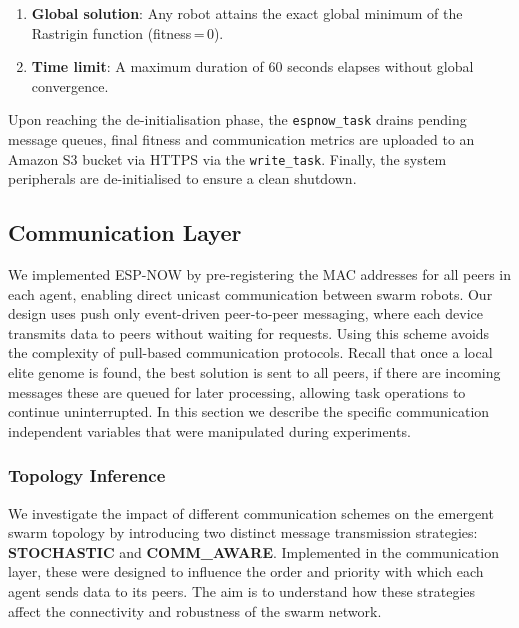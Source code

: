\documentclass[conference]{IEEEtran}
\begin{document}
\begin{enumerate}
  \item \textbf{Global solution}: Any robot attains the exact global minimum of the Rastrigin function (fitness\,=\,0).
  \item \textbf{Time limit}: A maximum duration of 60 seconds elapses without global convergence.
\end{enumerate}

Upon reaching the de-initialisation phase, the \texttt{espnow\_task} drains pending message queues, final fitness and communication metrics are uploaded to an Amazon S3 bucket via HTTPS via the \texttt{write\_task}. Finally, the system peripherals are de-initialised to ensure a clean shutdown.

\subsection{Communication Layer}\label{sec:comm-layer}

We implemented ESP-NOW by pre-registering the MAC addresses for all peers in each agent, enabling direct unicast communication between swarm robots. Our design uses push only event-driven peer-to-peer messaging, where each device transmits data to peers without waiting for requests. Using this scheme avoids the complexity of pull-based communication protocols. Recall that once a local elite genome is found, the best solution is sent to all peers, if there are incoming messages these are queued for later processing, allowing task operations to continue uninterrupted. In this section we describe the specific communication independent variables that were manipulated during experiments.\\

\subsubsection{Topology Inference}\label{sec:topology-inference}

We investigate the impact of different communication schemes on the emergent swarm topology by introducing two distinct message transmission strategies: \textbf{STOCHASTIC} and \textbf{COMM\_AWARE}. Implemented in the communication layer, these were designed to influence the order and priority with which each agent sends data to its peers. The aim is to understand how these strategies affect the connectivity and robustness of the swarm network.\\
\end{document}
